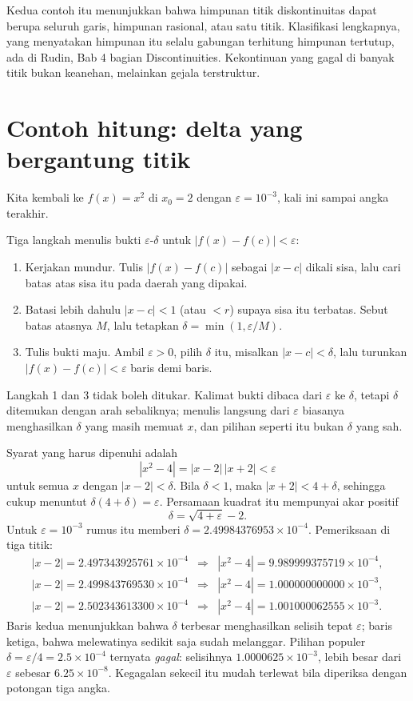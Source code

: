Kedua contoh itu menunjukkan bahwa himpunan titik diskontinuitas dapat berupa seluruh
garis, himpunan rasional, atau satu titik. Klasifikasi lengkapnya, yang menyatakan
himpunan itu selalu gabungan terhitung himpunan tertutup, ada di Rudin, Bab 4 bagian
Discontinuities. Kekontinuan yang gagal di banyak titik bukan keanehan, melainkan
gejala terstruktur.

\section{Contoh hitung: delta yang bergantung titik}

Kita kembali ke $f(x)=x^{2}$ di $x_{0}=2$ dengan $\varepsilon=10^{-3}$, kali ini
sampai angka terakhir.

\begin{resep}
Tiga langkah menulis bukti $\varepsilon$-$\delta$ untuk $|f(x)-f(c)|<\varepsilon$:
\begin{enumerate}
  \item Kerjakan mundur. Tulis $|f(x)-f(c)|$ sebagai $|x-c|$ dikali sisa, lalu cari
        batas atas sisa itu pada daerah yang dipakai.
  \item Batasi lebih dahulu $|x-c|<1$ (atau $<r$) supaya sisa itu terbatas. Sebut
        batas atasnya $M$, lalu tetapkan $\delta=\min(1,\varepsilon/M)$.
  \item Tulis bukti maju. Ambil $\varepsilon>0$, pilih $\delta$ itu, misalkan
        $|x-c|<\delta$, lalu turunkan $|f(x)-f(c)|<\varepsilon$ baris demi baris.
\end{enumerate}
Langkah 1 dan 3 tidak boleh ditukar. Kalimat bukti dibaca dari $\varepsilon$ ke
$\delta$, tetapi $\delta$ ditemukan dengan arah sebaliknya; menulis langsung dari
$\varepsilon$ biasanya menghasilkan $\delta$ yang masih memuat $x$, dan pilihan seperti
itu bukan $\delta$ yang sah.
\end{resep}

Syarat yang harus dipenuhi adalah
\[
|x^{2}-4|=|x-2|\,|x+2|<\varepsilon
\]
untuk semua $x$ dengan $|x-2|<\delta$. Bila $\delta<1$, maka $|x+2|<4+\delta$,
sehingga cukup menuntut $\delta(4+\delta)=\varepsilon$. Persamaan kuadrat itu
mempunyai akar positif
\[
\delta=\sqrt{4+\varepsilon}-2 .
\]
Untuk $\varepsilon=10^{-3}$ rumus itu memberi $\delta=2.49984376953\times10^{-4}$.
Pemeriksaan di tiga titik:
\[
\begin{array}{lll}
|x-2|=2.497343925761\times10^{-4} & \Rightarrow & |x^{2}-4|=9.989999375719\times10^{-4},\\
|x-2|=2.499843769530\times10^{-4} & \Rightarrow & |x^{2}-4|=1.000000000000\times10^{-3},\\
|x-2|=2.502343613300\times10^{-4} & \Rightarrow & |x^{2}-4|=1.001000062555\times10^{-3}.
\end{array}
\]
Baris kedua menunjukkan bahwa $\delta$ terbesar menghasilkan selisih tepat
$\varepsilon$; baris ketiga, bahwa melewatinya sedikit saja sudah melanggar. Pilihan
populer $\delta=\varepsilon/4=2.5\times10^{-4}$ ternyata \emph{gagal}: selisihnya
$1.0000625\times10^{-3}$, lebih besar dari $\varepsilon$ sebesar $6.25\times10^{-8}$.
Kegagalan sekecil itu mudah terlewat bila diperiksa dengan potongan tiga angka.

